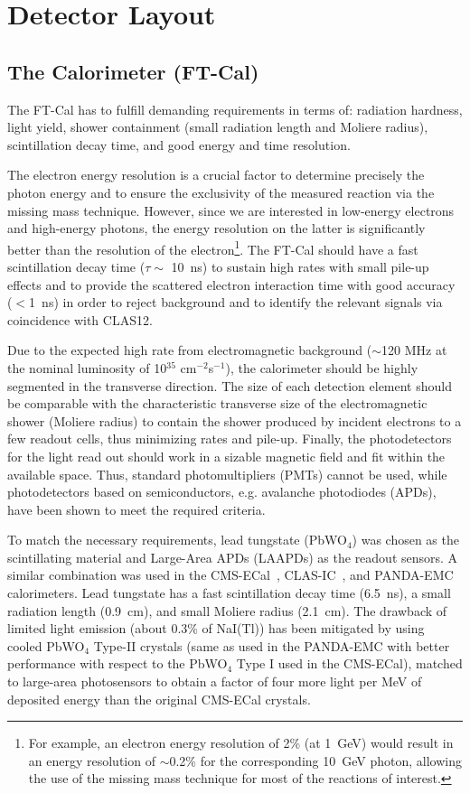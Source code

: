 \section{Detector Layout}

\subsection{The Calorimeter (FT-Cal)}

The FT-Cal has to fulfill demanding requirements in terms of: radiation hardness, light yield, shower containment
(small radiation length and Moliere radius), scintillation decay time, and good energy and time resolution.

The electron energy resolution is a crucial factor to determine precisely the photon energy and to ensure the
exclusivity of the measured reaction via the missing mass technique. However, since we are interested in low-energy
electrons and high-energy photons, the energy resolution on the latter is significantly better than the resolution of
the electron\footnote {For example, an electron energy resolution of 2\% (at 1~GeV) would result in an energy
  resolution of $\sim$0.2\% for the corresponding 10~GeV photon, allowing the use of the missing mass technique
  for most of the reactions of interest.}. The FT-Cal should have a fast scintillation decay time ($\tau\sim$ 10~ns)
to sustain high rates with small pile-up effects and to provide the scattered electron interaction time with good
accuracy ($<$1~ns) in order to reject background and to identify the relevant signals via coincidence with CLAS12.

Due to the expected high rate from electromagnetic background ($\sim$120 MHz at the nominal luminosity of
10$^{35}$ cm$^{-2}$s$^{-1}$), the calorimeter should be highly segmented in the transverse direction. The size of
each detection element should be comparable with the characteristic transverse size of the electromagnetic shower
(Moliere radius) to contain the shower produced by incident electrons to a few readout cells, thus minimizing rates
and pile-up. Finally, the photodetectors for the light read out should work  in a sizable magnetic field and fit within
the available space. Thus, standard photomultipliers (PMTs) cannot be used, while photodetectors based on
semiconductors, e.g. avalanche photodiodes (APDs), have been shown to meet the required criteria. 

To match the necessary requirements, lead tungstate (PbWO$_4$) was chosen as the scintillating material and
Large-Area APDs (LAAPDs) as the readout sensors. A similar  combination was used in the CMS-ECal~\cite{CMS-ECal},
CLAS-IC~\cite{CLAS-IC}, and PANDA-EMC~\cite{PANDA-ECal} calorimeters. Lead tungstate has a fast scintillation
decay time (6.5~ns), a small radiation length (0.9~cm), and small Moliere radius (2.1~cm). The drawback of limited
light emission (about 0.3\% of NaI(Tl)) has been mitigated by using cooled PbWO$_4$ Type-II crystals (same as
used in the PANDA-EMC with better performance with respect to the PbWO$_4$ Type I used in the CMS-ECal),
matched to large-area photosensors to obtain a factor of four more light per MeV of deposited energy than the
original CMS-ECal crystals.

